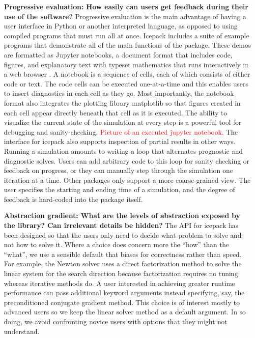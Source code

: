 \documentclass{article}
\theoremstyle{definition}
\theoremstyle{plain}
\begin{document}
\textbf{Progressive evaluation: How easily can users get feedback during their use of the software?}
Progressive evaluation is the main advantage of having a user interface in Python or another interpreted language, as opposed to using compiled programs that must run all at once.
Icepack includes a suite of example programs that demonstrate all of the main functions of the package.
These demos are formatted as Jupyter notebooks, a document format that includes code, figures, and explanatory text with typeset mathematics that runs interactively in a web browser \citep{kluyver2016jupyter}.
A notebook is a sequence of cells, each of which consists of either code or text.
The code cells can be executed one-at-a-time and this enables users to insert diagnostics in each cell as they go.
Most importantly, the notebook format also integrates the plotting library matplotlib so that figures created in each cell appear directly beneath that cell as it is executed.
The ability to visualize the current state of the simulation at every step is a powerful tool for debugging and sanity-checking.
\textcolor{red}{Picture of an executed jupyter notebook.}
The interface for icepack also supports inspection of partial results in other ways.
Running a simulation amounts to writing a loop that alternates prognostic and diagnostic solves.
Users can add arbitrary code to this loop for sanity checking or feedback on progress, or they can manually step through the simulation one iteration at a time.
Other packages only support a more coarse-grained view.
The user specifies the starting and ending time of a simulation, and the degree of feedback is hard-coded into the package itself.


\textbf{Abstraction gradient: What are the levels of abstraction exposed by the library?
Can irrelevant details be hidden?}
The API for icepack has been designed so that the users only need to decide what problem to solve and not how to solve it.
Where a choice does concern more the ``how'' than the ``what'', we use a sensible default that biases for correctness rather than speed.
For example, the Newton solver uses a direct factorization method to solve the linear system for the search direction because factorization requires no tuning whereas iterative methods do.
A user interested in achieving greater runtime performance can pass additional keyword arguments instead specifying, say, the preconditioned conjugate gradient method.
This choice is of interest mostly to advanced users so we keep the linear solver method as a default argument.
In so doing, we avoid confronting novice users with options that they might not understand.
\end{document}
